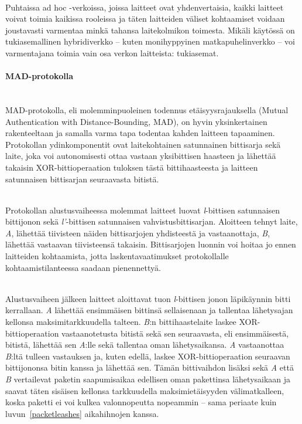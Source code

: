 \documentclass[finnish]{tktltiki2}
\theoremstyle{definition}
\theoremstyle{remark}
\begin{document}
\noindent\\
Puhtaissa ad hoc -verkoissa, joissa laitteet ovat yhdenvertaisia, kaikki laitteet voivat toimia kaikissa rooleissa ja täten laitteiden väliset kohtaamiset voidaan joustavasti varmentaa minkä tahansa laitekolmikon toimesta. Mikäli käytössä on tukiasemallinen hybridiverkko -- kuten monihyppyinen matkapuhelinverkko -- voi varmentajana toimia vain osa verkon laitteista: tukiasemat.

\paragraph{MAD-protokolla}
\noindent\\
MAD-protokolla, eli molemminpuoleinen todennus etäisyysrajauksella (Mutual Authentication with Distance-Bounding, MAD), on hyvin yksinkertainen rakenteeltaan ja samalla varma tapa todentaa kahden laitteen tapaaminen. Protokollan ydinkomponentit ovat laitekohtainen satunnainen bittisarja sekä laite, joka voi autonomisesti ottaa vastaan yksibittisen haasteen ja lähettää takaisin XOR-bittioperaation tuloksen tästä bittihaasteesta ja laitteen satunnaisen bittisarjan seuraavasta bitistä.

\noindent\\
Protokollan alustusvaiheessa molemmat laitteet luovat \emph{l}-bittisen satunnaisen bittijonon sekä \emph{l'}-bittisen satunnaisen vahvistusbittisarjan. Aloitteen tehnyt laite, \emph{A}, lähettää tiivisteen näiden bittisarjojen yhdisteestä ja vastaanottaja, \emph{B}, lähettää vastaavan tiivisteensä takaisin. Bittisarjojen luonnin voi hoitaa jo ennen laitteiden kohtaamista, jotta laskentavaatimukset protokollalle kohtaamistilanteessa saadaan pienennettyä.

\noindent\\
Alustusvaiheen jälkeen laitteet aloittavat tuon \emph{l}-bittisen jonon läpikäynnin bitti kerrallaan. \emph{A} lähettää ensimmäisen bittinsä sellaisenaan ja tallentaa lähetysajan kellonsa maksimitarkkuudella talteen. \emph{B}:n bittihaastelaite laskee XOR-bittioperaation vastaanotetusta bitistä sekä sen seuraavasta, eli ensimmäisestä, bitistä, lähettää sen \emph{A}:lle sekä tallentaa oman lähetysaikansa. \emph{A} vastaanottaa \emph{B}:ltä tulleen vastauksen ja, kuten edellä, laskee XOR-bittioperaation seuraavan bittijononsa bitin kanssa ja lähettää sen. Tämän bittivaihdon lisäksi sekä \emph{A} että \emph{B} vertailevat paketin saapumisaikaa edellisen oman pakettinsa lähetysaikaan ja saavat täten sisäisen kellonsa tarkkuudella maksimietäisyyden välimatkalleen, koska paketti ei voi kulkea valonnopeutta nopeammin -- sama periaate kuin luvun~\ref{packetleashes} aikahihnojen kanssa.
\end{document}
